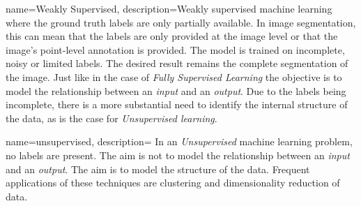
{
        name={Weakly Supervised},
        description={Weakly supervised machine learning where the ground truth labels are only partially available. 
        In image segmentation, this can mean that the labels are only provided at the image level or that the image's point-level annotation is provided.
        The model is trained on incomplete, noisy or limited labels. The desired result remains the complete segmentation of the image.
        Just like in the case of \textit{Fully Supervised Learning} the objective is to model the relationship between an \textit{input} and an \textit{output}. 
        Due to the labels being incomplete, there is a more substantial need to identify the internal structure of the data, as is the case for \textit{Unsupervised learning}.
        }
}




{
        name={unsupervised},
        description={
                In an \textit{Unsupervised} machine learning problem, no labels are present. 
                The aim is not to model the relationship between an \textit{input} and an \textit{output}. The aim is to model the structure of the data.
                Frequent applications of these techniques are clustering and dimensionality reduction of data. 
                }
}

